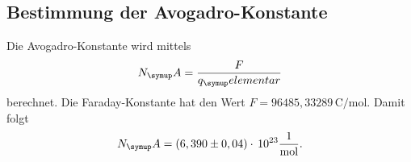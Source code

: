 \subsection{Bestimmung der Avogadro-Konstante}
Die Avogadro-Konstante wird mittels
\begin{equation}
  N_\su{A} = \frac{F}{q_\su{elementar}}
\end{equation}
berechnet. Die Faraday-Konstante hat den Wert $F=96485,33289\,\si{\coulomb\per\mol}$.
Damit folgt
\begin{equation}
  N_\su{A} = (6,390\pm0,04)\cdot\,10^{23}\si[per-mode=fraction]{\per\mol}.
\end{equation}

